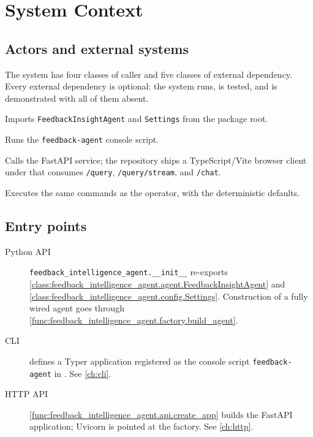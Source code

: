 
\chapter{System Context}
\label{ch:system-context}

\section{Actors and external systems}

The system has four classes of caller and five classes of external dependency.
Every external dependency is optional: the system runs, is tested, and is
demonstrated with all of them absent.

\begin{description}[nosep]
  \item[Library consumer] Imports \texttt{FeedbackInsightAgent} and
    \texttt{Settings} from the package root.
  \item[Operator / analyst] Runs the \texttt{feedback-agent} console script.
  \item[HTTP client] Calls the FastAPI service; the repository ships a
    TypeScript/Vite browser client under  that consumes
    \texttt{/query}, \texttt{/query/stream}, and \texttt{/chat}.
  \item[CI runner] Executes the same commands as the operator, with the
    deterministic defaults.
\end{description}



\section{Entry points}

\begin{description}
  \item[Python API] \texttt{feedback\_intelligence\_agent.\_\_init\_\_}
    re-exports \cref{class:feedback_intelligence_agent.agent.FeedbackInsightAgent}
    and \cref{class:feedback_intelligence_agent.config.Settings}. Construction
    of a fully wired agent goes through
    \cref{func:feedback_intelligence_agent.factory.build_agent}.
  \item[CLI]  defines a Typer
    application registered as the console script \texttt{feedback-agent} in
    . See \cref{ch:cli}.
  \item[HTTP API] \cref{func:feedback_intelligence_agent.api.create_app} builds
    the FastAPI application; Uvicorn is pointed at the factory. See
    \cref{ch:http}.
\end{description}


